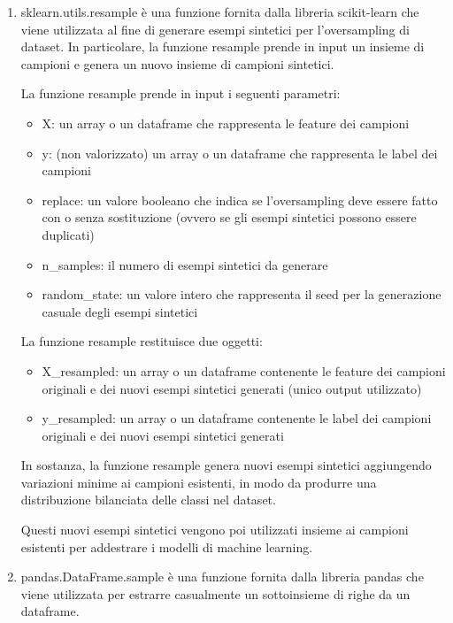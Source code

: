 \begin{enumerate}
\item sklearn.utils.resample è una funzione fornita dalla libreria scikit-learn che viene utilizzata al fine di generare esempi sintetici per l'oversampling di dataset. In particolare, la funzione resample prende in input un insieme di campioni e genera un nuovo insieme di campioni sintetici.

La funzione resample prende in input i seguenti parametri:
\begin{itemize}
\item X: un array o un dataframe che rappresenta le feature dei campioni
\item y: (non valorizzato) un array o un dataframe che rappresenta le label dei campioni
\item replace: un valore booleano che indica se l'oversampling deve essere fatto con o senza sostituzione (ovvero se gli esempi sintetici possono essere duplicati)
\item n\_samples: il numero di esempi sintetici da generare
\item random\_state: un valore intero che rappresenta il seed per la generazione casuale degli esempi sintetici
\end{itemize}

La funzione resample restituisce due oggetti:
\begin{itemize}
\item X\_resampled: un array o un dataframe contenente le feature dei campioni originali e dei nuovi esempi sintetici generati (unico output utilizzato)
\item y\_resampled: un array o un dataframe contenente le label dei campioni originali e dei nuovi esempi sintetici generati
\end{itemize}
In sostanza, la funzione resample genera nuovi esempi sintetici aggiungendo variazioni minime ai campioni esistenti, in modo da produrre una distribuzione bilanciata delle classi nel dataset. 

Questi nuovi esempi sintetici vengono poi utilizzati insieme ai campioni esistenti per addestrare i modelli di machine learning.


\item pandas.DataFrame.sample è una funzione fornita dalla libreria pandas che viene utilizzata per estrarre casualmente un sottoinsieme di righe da un dataframe. 


\end{enumerate}
